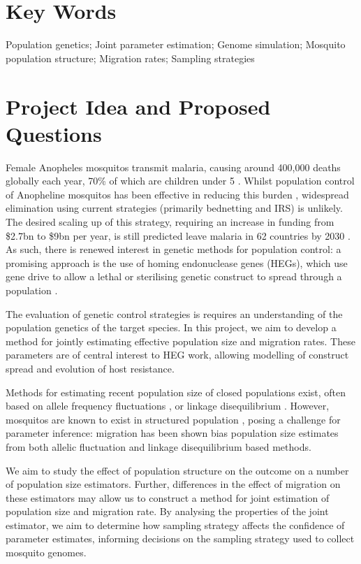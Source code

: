 \documentclass[11pt, a4paper]{article}
\begin{document}
\begin{linenumbers}
\section*{Key Words}
\noindent Population genetics; Joint parameter estimation; Genome simulation; Mosquito population structure; Migration rates; Sampling strategies

\section*{Project Idea and Proposed Questions}
\noindent Female Anopheles mosquitos transmit malaria, causing around 400,000 deaths globally each year, 70\% of which are children under 5 \cite{WHO_report}. Whilst population control of Anopheline mosquitos has been effective in reducing this burden \cite{historical_review}, widespread elimination using current strategies (primarily bednetting and IRS) is unlikely. The desired scaling up of this strategy, requiring an increase in funding from \$2.7bn to \$9bn per year, is still predicted leave malaria in 62 countries by 2030 \cite{griffin}. As such, there is renewed interest in genetic methods for population control: a promising approach is the use of homing endonuclease genes (HEGs), which use gene drive to allow a lethal or sterilising genetic construct to spread through a population \cite{burt}.

The evaluation of genetic control strategies is requires an understanding of the population genetics of the target species. In this project, we aim to develop a method for jointly estimating effective population size and migration rates. These parameters are of central interest to HEG work, allowing modelling of construct spread and evolution of host resistance.

Methods for estimating recent population size of closed populations exist, often based on allele frequency fluctuations \cite{Waples1989}, or linkage disequilibrium \cite{hill_1981}. However, mosquitos are known to exist in structured population \cite{ag1000nature}, posing a challenge for parameter inference: migration has been shown bias population size estimates from both allelic fluctuation \cite{wang} and linkage disequilibrium \cite{waples2011} based methods.

We aim to study the effect of population structure on the outcome on a number of population size estimators. Further, differences in the effect of migration on these estimators may allow us to construct a method for joint estimation of population size and migration rate. By analysing the properties of the joint estimator, we aim to determine how sampling strategy affects the confidence of parameter estimates, informing decisions on the sampling strategy used to collect mosquito genomes.


\end{linenumbers}
\end{document}
